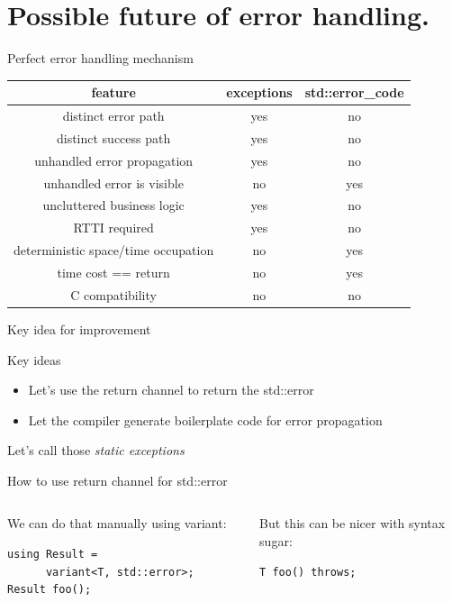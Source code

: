 \documentclass[10pt]{beamer}
\begin{document}
\section{Possible future of error handling.}

\begin{frame}{Perfect error handling mechanism}
	\centering
	\begin{tabular}{|c|c|c|}
		\hline
		feature & exceptions & std::error\_code \\ \hline \hline
		distinct error path & yes & no \\ \hline
		distinct success path & yes & no \\ \hline \hline
		unhandled error propagation & yes & no \\ \hline
		unhandled error is visible & no & yes \\ \hline
		uncluttered business logic & yes & no \\ \hline \hline
		RTTI required & yes & no \\ \hline
		deterministic space/time occupation & no & yes \\ \hline
		time cost == return & no & yes \\ \hline \hline
		C compatibility & no & no \\ \hline
	\end{tabular}
\end{frame}

\begin{frame}{Key idea for improvement}
	\begin{block}{Key ideas}
		\begin{itemize}[<+- | alert@+>]
			\item Let's use the return channel to return the std::error
			\item Let the compiler generate boilerplate code for error propagation
		\end{itemize}
	\end{block}
	Let's call those \emph{\color{amethyst}static exceptions}
\end{frame}
	
\begin{frame}[fragile]{How to use return channel for std::error}
	\begin{columns}[T]
		\begin{column}{0.48\linewidth}
			We can do that manually using variant:
			\begin{verbatim}
using Result = 
      variant<T, std::error>;			
Result foo();
			\end{verbatim}
		\end{column}
		\begin{column}{0.48\linewidth}
			But this can be nicer with syntax sugar:
			\begin{verbatim}
T foo() throws;
			\end{verbatim}
		\end{column}
	\end{columns}
\end{frame}
\end{document}
